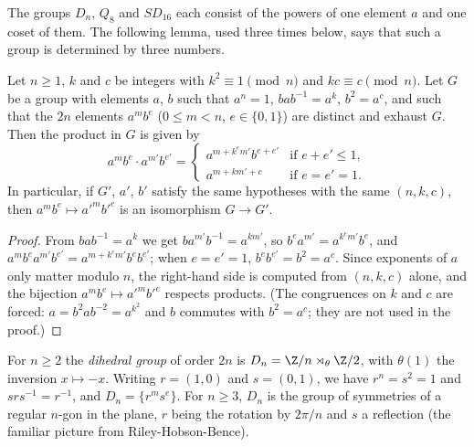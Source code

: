 The groups $D_n$, $Q_8$ and $SD_{16}$ each consist of the powers of one element $a$ and one coset of them. The following lemma, used
three times below, says that such a group is determined by three numbers.

\begin{lemma}\label{lem:groups:normalform}
Let $n\ge1$, $k$ and $c$ be integers with $k^2\equiv1\pmod n$ and $kc\equiv c\pmod n$. Let $G$ be a group with elements $a$, $b$ such that
$a^n=1$, $bab^{-1}=a^k$, $b^2=a^c$, and such that the $2n$ elements $a^mb^e$ ($0\le m<n$, $e\in\{0,1\}$) are distinct and exhaust $G$.
Then the product in $G$ is given by
\[
a^mb^e\cdot a^{m'}b^{e'}=\begin{cases}a^{m+k^em'}b^{e+e'}&\text{if }e+e'\le1,\\ a^{m+km'+c}&\text{if }e=e'=1.\end{cases}
\]
In particular, if $G'$, $a'$, $b'$ satisfy the same hypotheses with the same $(n,k,c)$, then $a^mb^e\mapsto a'^mb'^e$ is an isomorphism $G\to G'$.
\end{lemma}

\begin{proof}
From $bab^{-1}=a^k$ we get $ba^{m'}b^{-1}=a^{km'}$, so $b^ea^{m'}=a^{k^em'}b^e$, and $a^mb^ea^{m'}b^{e'}=a^{m+k^em'}b^eb^{e'}$; when $e=e'=1$,
$b^eb^{e'}=b^2=a^c$. Since exponents of $a$ only matter modulo $n$, the right-hand side is computed from $(n,k,c)$ alone, and the
bijection $a^mb^e\mapsto a'^mb'^e$ respects products. (The congruences on $k$ and $c$ are forced: $a=b^2ab^{-2}=a^{k^2}$ and $b$ commutes with
$b^2=a^c$; they are not used in the proof.)
\end{proof}

\begin{definition}\label{def:groups:dihedral}
For $n\ge2$ the \emph{dihedral group} of order $2n$ is $D_n=\Z/n\rtimes_\theta\Z/2$, with $\theta(1)$ the inversion $x\mapsto-x$. Writing
$r=(1,0)$ and $s=(0,1)$, we have $r^n=s^2=1$ and $srs^{-1}=r^{-1}$, and $D_n=\{r^ms^e\}$. For $n\ge3$, $D_n$ is the group of symmetries of a
regular $n$-gon in the plane, $r$ being the rotation by $2\pi/n$ and $s$ a reflection (the familiar picture from Riley-Hobson-Bence).
\end{definition}

